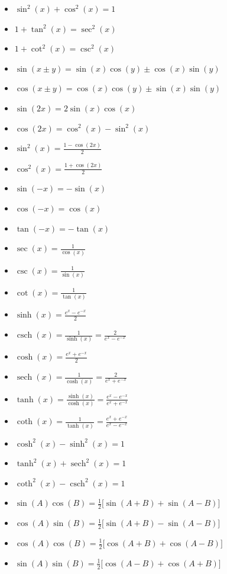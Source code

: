 \documentclass[10pt,landscape]{article}
\begin{document}
\begin{multicols}{2}
\begin{itemize}
    \item $\sin^2{(x)}+\cos^2{(x)}=1$
    \item $1+\tan^2(x)=\sec^2(x)$
    \item $1+\cot^2(x)=\csc^2(x)$
    \item $\sin{(x\pm y)}= \sin (x)\cos (y)\pm \cos (x)\sin (y)$
    \item $\cos{(x\pm y)}= \cos (x) \cos (y)\pm \sin (x)\sin (y)$
    \item $\sin(2x)= 2\sin(x)\cos(x)$
    \item $\cos(2x)= \cos^2(x)-\sin^2(x)$
    \item $\displaystyle\sin^2(x)= \frac{1-\cos(2x)}{2}$
    \item $\displaystyle\cos^2(x)= \frac{1+\cos(2x)}{2}$
    \item $\sin(-x)=-\sin(x)$
    \item $\cos(-x)=\cos(x)$
    \item $\tan(-x)=-\tan(x)$
    \item $\displaystyle\sec(x)= \frac{1}{\cos(x)}$
    \item $\displaystyle\csc(x)=\frac{1}{\sin(x)}$
    \item $\displaystyle\cot(x)=\frac{1}{\tan(x)}$ 
    \item $\displaystyle\sinh(x) = \frac{e^x - e^{-x}}{2}$
    \item $\displaystyle\operatorname{csch}(x) = \frac{1}{\sinh(x)} = \frac{2}{e^x - e^{-x}}$
    \item $\displaystyle\cosh(x) = \frac{e^x + e^{-x}}{2}$
    \item $\displaystyle\operatorname{sech}(x) = \frac{1}{\cosh(x)} = \frac{2}{e^x + e^{-x}}$
    \item $\displaystyle\tanh(x) = \frac{\sinh(x)}{\cosh(x)} = \frac{e^x - e^{-x}}{e^x + e^{-x}}$
    \item$\displaystyle\coth(x) = \frac{1}{\tanh(x)} = \frac{e^x + e^{-x}}{e^x - e^{-x}}$
    \item $\cosh^2(x) - \sinh^2(x) = 1$
    \item $\tanh^2(x) + \operatorname{sech}^2(x) = 1$
    \item $\coth^2(x) - \operatorname{csch}^2(x) = 1$
    \item $\sin(A)\cos(B) = \frac{1}{2}\big[\sin(A+B)+\sin(A-B)\big]$
    \item $\cos(A)\sin(B) = \frac{1}{2}\big[\sin(A+B)-\sin(A-B)\big]$
    \item $\cos(A)\cos(B) = \frac{1}{2}\big[\cos(A+B) + \cos(A-B)\big]$
    \item $\sin(A)\sin(B) = \frac{1}{2}\big[\cos(A-B) + \cos(A+B)\big]$


\end{itemize}
\end{multicols}
\end{document}
